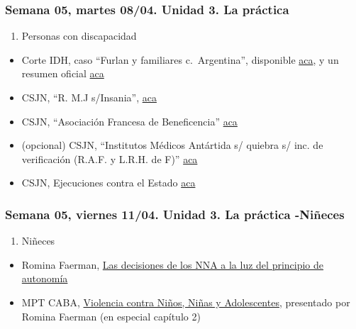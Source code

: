 \documentclass[
]{article}
\providecommand{\tightlist}{%
  \setlength{\itemsep}{0pt}\setlength{\parskip}{0pt}}
\begin{document}
\subsubsection{Semana 05, martes 08/04. Unidad 3. La
práctica}\label{semana-05-martes-0804.-unidad-3.-la-pruxe1ctica}

\begin{enumerate}
\def\labelenumi{\alph{enumi}.}
\setcounter{enumi}{1}
\tightlist
\item
  Personas con discapacidad
\end{enumerate}

\begin{itemize}
\item
  Corte IDH, caso ``Furlan y familiares c.~Argentina'', disponible
  \href{https://www.corteidh.or.cr/docs/casos/articulos/seriec_246_esp.pdf}{aca},
  y un resumen oficial
  \href{https://www.corteidh.or.cr/docs/casos/articulos/resumen_246_esp.pdf}{aca}
\item
  CSJN, ``R. M.J s/Insania'',
  \href{https://drive.google.com/file/d/1c29zw3cQDmwNGuO-GDR15KUq7Xc-UZJb/view?usp=sharing}{aca}
\item
  CSJN, ``Asociación Francesa de Beneficencia''
  \href{https://drive.google.com/file/d/1hVROXu_IFbswD_0UtcBpXPZ0gEbTIiQJ/view?usp=share_link}{aca}
\item
  (opcional) CSJN, ``Institutos Médicos Antártida s/ quiebra s/ inc. de
  verificación (R.A.F. y L.R.H. de F)''
  \href{https://drive.google.com/file/d/1THtTAOVsLhI8y5mQq5mNTLrt-LFdFc-K/view?usp=sharing}{aca}
\item
  CSJN, Ejecuciones contra el Estado
  \href{https://drive.google.com/file/d/1X2oK8aGhqhadJ7YkQCHktaT49Ypk5udZ/view?usp=share_link}{aca}
\end{itemize}

\subsubsection{Semana 05, viernes 11/04. Unidad 3. La práctica
-Niñeces}\label{semana-05-viernes-1104.-unidad-3.-la-pruxe1ctica--niuxf1eces}

\begin{enumerate}
\def\labelenumi{\alph{enumi}.}
\setcounter{enumi}{2}
\tightlist
\item
  Niñeces
\end{enumerate}

\begin{itemize}
\item
  Romina Faerman,
  \href{https://drive.google.com/file/d/1vjWDNx026ng38dl2I4G_ojXGlBQt23TT/view?usp=sharing}{Las
  decisiones de los NNA a la luz del principio de autonomía}
\item
  MPT CABA,
  \href{https://drive.google.com/file/d/1lc3H955K8Wx1-7mdtDAJX--CBBcqXfuX/view?usp=sharing}{Violencia
  contra Niños, Niñas y Adolescentes}, presentado por Romina Faerman (en
  especial capítulo 2)
\end{itemize}
\end{document}
